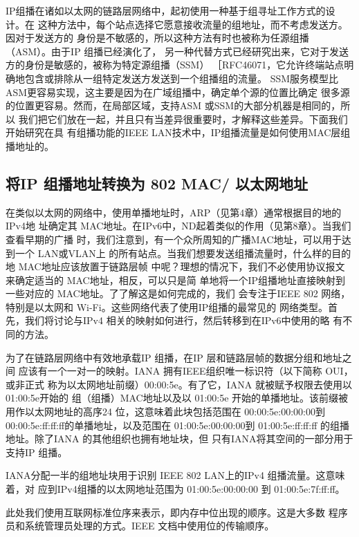 IP组播在诸如以太网的链路层网络中，起初使用一种基于组寻址工作方式的设计。在
这种方法中，每个站点选择它愿意接收流量的组地址，而不考虑发送方。因对于发送方的
身份是不敏感的，所以这种方法有时也被称为任源组播（ASM）。由于IP 组播已经演化了，
另一种代替方式已经研究出来，它对于发送方的身份是敏感的，被称为特定源组播（SSM）
［RFC46071，它允许终端站点明确地包含或排除从一组特定发送方发送到一个组播组的流量。
SSM服务模型比 ASM更容易实现，这主要是因为在广域组播中，确定单个源的位置比确定
很多源的位置更容易。然而，在局部区域，支持ASM 或SSM的大部分机器是相同的，所以
我们把它们放在一起，并且只有当差异很重要时，才解释这些差异。下面我们开始研究在具
有组播功能的IEEE LAN技术中，IP组播流量是如何使用MAC层组播地址的。

\subsection{将IP 组播地址转换为 802 MAC/ 以太网地址}

在类似以太网的网络中，使用单播地址时，ARP（见第4章）通常根据目的地的IPv4地
址确定其 MAC地址。在IPv6中，ND起着类似的作用（见第8章）。当我们查看早期的广播
时，我们注意到，有一个众所周知的广播MAC地址，可以用于达到一个 LAN或VLAN上
的所有站点。当我们想要发送组播流量时，什么样的目的地 MAC地址应该放置于链路层帧
中呢？理想的情况下，我们不必使用协议报文来确定适当的 MAC地址，相反，可以只是简
单地将一个IP组播地址直接映射到一些对应的 MAC地址。了了解这是如何完成的，我们
会专注于IEEE 802 网络，特别是以太网和 Wi-Fi。这些网络代表了使用IP组播的最常见的
网络类型。首先，我们将讨论与IPv4 相关的映射如何进行，然后转移到在IPv6中使用的略
有不同的方法。

为了在链路层网络中有效地承载IP 组播，在IP 层和链路层帧的数据分组和地址之间
应该有一个一对一的映射。IANA 拥有IEEE组织唯一标识符（以下简称 OUI，或非正式
称为以太网地址前缀）00:00:5e。有了它，IANA 就被赋予权限去使用以01:00:5e开始的
组（组播）MAC地址以及以 01:00:5e 开始的单播地址。该前缀被用作以太网地址的高序24
位，这意味着此块包括范围在 00:00:5e:00:00:00到 00:00:5e:ff:ff:ff的单播地址，以及范围在
01:00:5e:00:00:00到 01:00:5e:ff:ff:ff 的组播地址。除了IANA 的其他组织也拥有地址块，但
只有IANA将其空间的一部分用于支持IP 组播。

IANA分配一半的组地址块用于识别 IEEE 802 LAN上的IPv4 组播流量。这意味着，对
应到IPv4组播的以太网地址范围为 01:00:5e:00:00:00 到 01:00:5e:7f:ff:ff。

\begin{tcolorbox}
    此处我们使用互联网标准位序来表示，即内存中位出现的顺序。这是大多数
    程序员和系统管理员处理的方式。IEEE 文档中使用位的传输顺序。
\end{tcolorbox}

